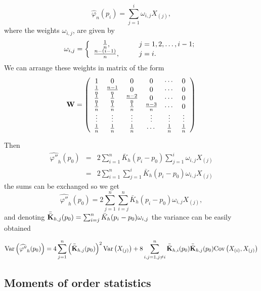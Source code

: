 \documentclass[preprint,12pt]{elsarticle}
\begin{document}
\[
\widehat{\varphi}_n(p_i)=\sum_{j=1}^i\omega_{i,j} X_{(j)},
\] 
where the weights $\omega_{i,j}$, are given by 
\[
\omega_{i,j}=\left\{\begin{array}{cll}
\frac{1}{n}, & \hspace{0.3cm}& j= 1,2, \ldots, i-1; \\
\frac{n-(i-1)}{n},& \hspace{0.3cm}& j= i. \\
\end{array}\right.
\]
We can arrange these weights in matrix of the form
\[
{\bf W} =\left(
\begin{array}{cccccc}
1 & 0 &0 &0& \cdots &0 \\
\frac{1}{n} & \frac{n-1}{n}&0&0&\cdots& 0 \\
\frac{1}{n} & \frac{1}{n}&\frac{n-2}{n}&0&\cdots& 0 \\
\frac{1}{n} & \frac{1}{n}&\frac{1}{n}&\frac{n-3}{n}&\cdots& 0 \\
\vdots&\vdots&\vdots&\vdots&\vdots&\vdots \\
\frac{1}{n} & \frac{1}{n}&\frac{1}{n}&\cdots&\frac{1}{n}& \frac{1}{n} \\
\end{array}
\right)
\]

Then
\begin{eqnarray*}
\widehat{\varphi''}_h(p_0)&=&2\sum_{i=1}^n \bar{K}_h(p_i-p_0)\sum_{j=1}^i\omega_{i,j}X_{(j)} \\
&=& 2\sum_{i=1}^n \sum_{j=1}^i \bar{K}_h(p_i-p_0)\omega_{i,j}X_{(j)} 
\end{eqnarray*}
the sums can be exchanged so we get
\begin{equation*}
\widehat{\varphi''}_h(p_0)=2  \sum_{j=1}^n \sum_{i=j}^n \bar{K}_h(p_i-p_0)\omega_{i,j}X_{(j)}, 
\end{equation*}
and denoting $\bar{\bar{{\bf K}}}_{h,j}(p_0)=\sum_{i=j}^n \bar{K}_h(p_i-p_0)\omega_{i,j}$ the variance can be easily obtained

\begin{equation}\label{V.phi2}
{\rm Var} \left(\widehat{\varphi''}_h(p_0)\right)=4 \sum_{j=1}^n\left(\bar{\bar{{\bf K}}}_{h,j}(p_0)\right)^2 {\rm Var}\left(X_{(j)}\right)+
8\sum_{i,j=1,{j \neq i}}^n \bar{\bar{{\bf K}}}_{h,i}(p_0)\bar{\bar{{\bf K}}}_{h,j}(p_0) {\rm Cov}\left(X_{(i)},X_{(j)}\right)
\end{equation}

\newpage
\subsection{\textbf{Moments of order statistics}}
\end{document}
